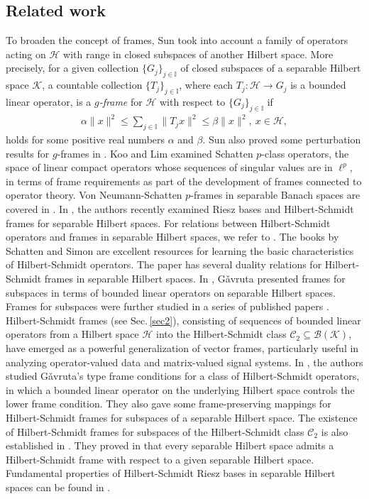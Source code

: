 \documentclass[reqno]{amsart}
\theoremstyle{plain}
\theoremstyle{remark}
\numberwithin{equation}{section}
\begin{document}
\subsection{Related work}
To broaden the concept of frames, Sun \cite{WsunI}  took into account a family of operators acting on $\mathcal{H}$  with range in closed subspaces of another Hilbert space. More precisely,  for a given collection $\{G_j\}_{j \in \mathbb{I}}$ of closed subspaces of  a separable Hilbert space $\mathcal{K}$, a countable collection $\{T_j\}_{j \in \mathbb{I}}$, where each $T_j:\mathcal{H} \rightarrow  G_j$ is a bounded linear operator,  is a \emph{$g$-frame}  for $\mathcal{H}$ with respect to $\{G_j\}_{j \in \mathbb{I}}$ if
\begin{align*}
\alpha \|x\|^2 \leq \sum\limits_{j \in \mathbb{I}}\|T_j x\|^2 \leq \beta \|x\|^2, \  x \in \mathcal{H},
\end{align*}
holds for some positive real numbers $\alpha$ and $\beta$. Sun also proved some perturbation results for $g$-frames in \cite{WsunII}. Koo and Lim \cite{Yoo} examined Schatten $p$-class operators, the space of linear compact operators whose sequences of singular values are in $\ell^p$, in terms of frame requirements as part of the development of frames connected to operator theory. Von Neumann-Schatten $p$-frames in separable Banach spaces are covered in \cite{SA}.  In \cite{JVPDF1}, the authors recently examined Riesz bases and Hilbert-Schmidt frames for separable Hilbert spaces.
For relations between Hilbert-Schmidt operators and frames in separable Hilbert spaces, we refer to \cite{Balaza}. The books by Schatten \cite{SCHI} and Simon \cite{B.simon} are excellent resources for learning the basic characteristics of Hilbert-Schmidt operators. The paper \cite{WZhang} has several duality relations for Hilbert-Schmidt frames in separable Hilbert spaces. In \cite{LG}, G\v{a}vruta  presented frames for subspaces in terms of bounded linear operators on separable Hilbert spaces. Frames for subspaces were further studied in a series of published papers \cite{DVV17, DV17ar, XZG}.
Hilbert-Schmidt frames (see Sec.\,\ref{sec2}), consisting of sequences of bounded linear operators from a Hilbert space $\mathcal{H}$ into the Hilbert-Schmidt class $\mathcal{C}_2 \subseteq \mathcal{B}(\mathcal{K})$, have emerged as a powerful generalization of vector frames, particularly useful in analyzing operator-valued data and matrix-valued signal systems. In \cite{JV23}, the authors studied G\v{a}vruta's type frame conditions  for a class of Hilbert-Schmidt operators, in which a bounded linear operator on the underlying Hilbert space controls the  lower frame condition. They also gave some frame-preserving mappings for Hilbert-Schmidt frames for subspaces of a separable Hilbert space. The existence of  Hilbert-Schmidt frames  for  subspaces  of the Hilbert-Schmidt class $\mathcal{C}_2$ is also established in \cite{JV23}.
They proved in  \cite{JV23} that every separable Hilbert space admits a Hilbert-Schmidt frame with respect to a given separable Hilbert space. Fundamental properties of Hilbert-Schmidt Riesz bases in separable Hilbert spaces can be found in  \cite{JV23}.
\end{document}
